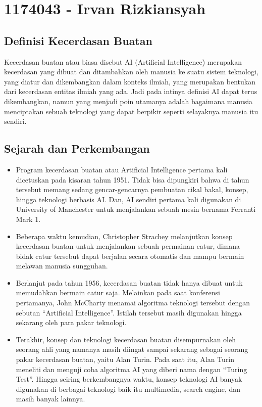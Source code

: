 \section{1174043 - Irvan Rizkiansyah}
	\subsection {Definisi Kecerdasan Buatan}
	Kecerdasan buatan atau biasa disebut AI (Artificial Intelligence) merupakan kecerdasan yang dibuat dan ditambahkan oleh manusia ke suatu sistem teknologi, yang diatur dan dikembangkan dalam konteks ilmiah, yang merupakan bentukan dari kecerdasan entitas ilmiah yang ada. Jadi pada intinya definisi AI dapat terus dikembangkan, namun yang menjadi poin utamanya adalah bagaimana manusia menciptakan sebuah teknologi yang dapat berpikir seperti selayaknya manusia itu sendiri.
	
	\subsection{Sejarah dan Perkembangan}
	\begin{itemize}
		\item Program kecerdasan buatan atau Artificial Intelligence pertama kali dicetuskan pada kisaran tahun 1951. Tidak bisa dipungkiri bahwa di tahun tersebut memang sedang gencar-gencarnya pembuatan cikal bakal, konsep, hingga teknologi berbasis AI. Dan, AI sendiri pertama kali digunakan di University of Manchester untuk menjalankan sebuah mesin bernama Ferranti Mark 1.
		\item Beberapa waktu kemudian, Christopher Strachey melanjutkan konsep kecerdasan buatan untuk menjalankan sebuah permainan catur, dimana bidak catur tersebut dapat berjalan secara otomatis dan mampu bermain melawan manusia sungguhan.
		\item Berlanjut pada tahun 1956, kecerdasan buatan tidak hanya dibuat untuk memudahkan bermain catur saja. Melainkan pada saat konferensi pertamanya, John McCharty menamai algoritma teknologi tersebut dengan sebutan “Artificial Intelligence”. Istilah tersebut masih digunakan hingga sekarang oleh para pakar teknologi.
		\item Terakhir, konsep dan teknologi kecerdasan buatan disempurnakan oleh seorang ahli yang namanya masih diingat sampai sekarang sebagai seorang pakar kecerdasan buatan, yaitu Alan Turin. Pada saat itu, Alan Turin meneliti dan menguji coba algoritma AI yang diberi nama dengan “Turing Test”. Hingga seiring berkembangnya waktu, konsep teknologi AI banyak digunakan di berbagai teknologi baik itu multimedia, search engine, dan masih banyak lainnya.
	\end{itemize}
	
